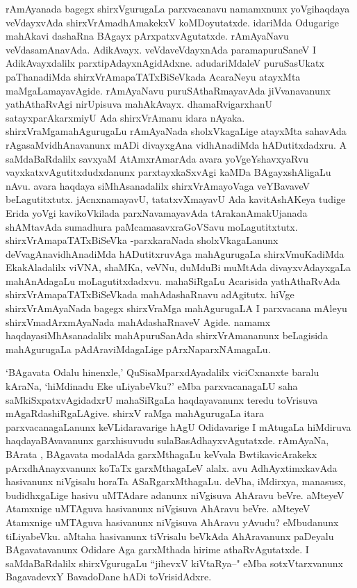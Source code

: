 rAmAyanada bagegx  shirxVgurugaLa parxvacanavu namamxnunx yoVgihaqdaya veVdayxvAda shirxVrAmadhAmakekxV koMDoyutatxde. idariMda Odugarige mahAkavi dashaRna BAgayx pArxpatxvAgutatxde. rAmAyaNavu veVdasamAnavAda. AdikAvayx. veVdaveVdayxnAda paramapuruSaneV I AdikAvayxdalilx parxtipAdayxnAgidAdxne. adudariMdaleV puruSasUkatx  paThanadiMda shirxVrAmapaTATxBiSeVkada AcaraNeyu atayxMta maMgaLamayavAgide. rAmAyaNavu puruSAthaRmayavAda jiVvanavanunx yathAthaRvAgi nirUpisuva mahAkAvayx. dhamaRvigarxhanU satayxparAkarxmiyU Ada shirxVrAmanu idara nAyaka. shirxVraMgamahAgurugaLu rAmAyaNada sholxVkagaLige atayxMta sahavAda rAgasaMvidhAnavanunx mADi divayxgAna vidhAnadiMda hADutitxdadxru. A saMdaBaRdalilx savxyaM AtAmxrAmarAda avara yoVgeYshavxyaRvu vayxkatxvAgutitxdudxdanunx parxtayxkaSxvAgi kaMDa BAgayxshAligaLu nAvu. avara haqdaya siMhAsanadalilx shirxVrAmayoVaga veYBavaveV beLagutitxtutx. jAcnxnamayavU, tatatxvXmayavU Ada kavitAshAKeya tudige Erida yoVgi kavikoVkilada parxNavamayavAda tArakanAmakUjanada shAMtavAda sumadhura paMcamasavxraGoVSavu moLagutitxtutx. shirxVrAmapaTATxBiSeVka -parxkaraNada sholxVkagaLanunx deVvagAnavidhAnadiMda hADutitxruvAga mahAgurugaLa shirxVmuKadiMda EkakAladalilx viVNA, shaMKa, veVNu, duMduBi muMtAda divayxvAdayxgaLa mahAnAdagaLu moLagutitxdadxvu. mahaSiRgaLu Acarisida yathAthaRvAda shirxVrAmapaTATxBiSeVkada mahAdashaRnavu adAgitutx. hiVge shirxVrAmAyaNada bagegx shirxVraMga mahAgurugaLA I parxvacana mAleyu shirxVmadArxmAyaNada mahAdashaRnaveV Agide. namamx haqdayasiMhAsanadalilx mahApuruSanAda shirxVrAmananunx beLagisida mahAgurugaLa pAdAraviMdagaLige pArxNaparxNAmagaLu.

`BAgavata Odalu hinenxle,' QuSisaMparxdAyadalilx viciCxnanxte baralu kAraNa, `hiMdinadu Eke uLiyabeVku?' eMba parxvacanagaLU saha saMkiSxpatxvAgidadxrU mahaSiRgaLa haqdayavanunx teredu toVrisuva mAgaRdashiRgaLAgive. shirxV raMga mahAgurugaLa itara parxvacanagaLanunx keVLidaravarige hAgU Odidavarige I mAtugaLa hiMdiruva haqdayaBAvavanunx garxhisuvudu sulaBasAdhayxvAgutatxde. rAmAyaNa, BArata , BAgavata modalAda garxMthagaLu keVvala BwtikavicArakekx pArxdhAnayxvanunx  koTaTx garxMthagaLeV alalx. avu AdhAyxtimxkavAda hasivanunx niVgisalu horaTa ASaRgarxMthagaLu. deVha, iMdirxya, manasusx, budidhxgaLige hasivu uMTAdare adanunx  niVgisuva AhAravu beVre. aMteyeV Atamxnige uMTAguva hasivanunx niVgisuva AhAravu beVre. aMteyeV Atamxnige uMTAguva hasivanunx niVgisuva AhAravu yAvudu? eMbudanunx tiLiyabeVku. aMtaha hasivanunx tiVrisalu beVkAda AhAravanunx paDeyalu BAgavatavanunx Odidare Aga garxMthada hirime athaRvAgutatxde. I saMdaBaRdalilx shirxVgurugaLu ``jihevxV kiVtaRya--" eMba sotxVtarxvanunx BagavadevxY BavadoDane hADi toVrisidAdxre.

